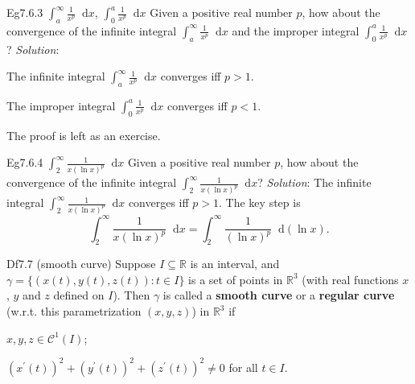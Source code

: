 \documentclass{article}
\newcommand{\dif}{\mathop{}\!\mathrm{d}}
\begin{document}
\begin{Th}{Eg7.6.3 $\int_a^\infty \frac{1}{x^p}\dif x$, $\int_0^a \frac{1}{x^p}\dif x$}
    Given a positive real number $p$, how about the convergence of the infinite integral $\int_a^\infty \frac{1}{x^p}\dif x$ and the improper integral $\int_0^a \frac{1}{x^p}\dif x$?
    \tcblower
    \textit{Solution}:
    \begin{compactenum}
        \item The infinite integral $\int_a^\infty \frac{1}{x^p}\dif x$ converges iff $p>1$.
        \item The improper integral $\int_0^a \frac{1}{x^p}\dif x$ converges iff $p<1$.
    \end{compactenum}
    The proof is left as an exercise.
\end{Th}

\begin{Th}{Eg7.6.4 $\int_2^\infty \frac{1}{x(\ln x)^p}\dif x$}
    Given a positive real number $p$, how about the convergence of the infinite integral $\int_2^\infty \frac{1}{x(\ln x)^p}\dif x$?
    \tcblower
    \textit{Solution}: The infinite integral $\int_2^\infty \frac{1}{x(\ln x)^p}\dif x$ converges iff $p>1$. The key step is
    $$\int_2^\infty \frac{1}{x(\ln x)^p}\dif x = \int_2^\infty \frac{1}{(\ln x)^p}\dif (\ln x).$$    
\end{Th}

\begin{Df}{Df7.7 (smooth curve)}
    Suppose $I\subseteq\mathbb{R}$ is an interval, and $\gamma = \{(x(t), y(t), z(t)): t\in I\}$ is a set of points in $\mathbb{R}^3$ (with real functions $x$, $y$ and $z$ defined on $I$). Then $\gamma$ is called a \textbf{smooth curve} or a \textbf{regular curve} (w.r.t. this parametrization $(x,y,z)$) in $\mathbb{R}^3$ if
    \begin{compactenum}
        \item $x, y, z\in \mathcal{C}^1(I)$;
        \item $(x^\prime(t))^2 + (y^\prime(t))^2 + (z^\prime(t))^2 \neq 0$ for all $t\in I$.
    \end{compactenum}
\end{Df}
\end{document}
